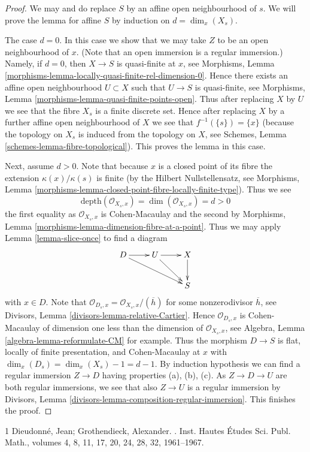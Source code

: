 \documentclass[10pt,a4paper]{amsart}
\theoremstyle{plain}
\theoremstyle{definition}
\theoremstyle{remark}
\numberwithin{equation}{subsection}
\begin{document}
\begin{proof}
We may and do replace $S$ by an affine open neighbourhood of $s$.
We will prove the lemma for affine $S$ by induction on $d = \dim_x(X_s)$.

\medskip\noindent
The case $d = 0$. In this case we show that we may take $Z$ to be
an open neighbourhood of $x$. (Note that an open immersion is
a regular immersion.) Namely, if $d = 0$, then $X \to S$
is quasi-finite at $x$, see
Morphisms, Lemma \ref{morphisms-lemma-locally-quasi-finite-rel-dimension-0}.
Hence there exists an affine open neighbourhood $U \subset X$ such
that $U \to S$ is quasi-finite, see
Morphisms, Lemma \ref{morphisms-lemma-quasi-finite-points-open}.
Thus after replacing $X$ by $U$ we see that the fibre $X_s$ is a finite
discrete set. Hence after replacing $X$ by a further affine open neighbourhood
of $X$ we see that $f^{-1}(\{s\}) = \{x\}$ (because the topology
on $X_s$ is induced from the topology on $X$, see
Schemes, Lemma \ref{schemes-lemma-fibre-topological}).
This proves the lemma in this case.

\medskip\noindent
Next, assume $d > 0$. Note that because $x$ is a closed point of its
fibre the extension $\kappa(x)/\kappa(s)$ is finite (by the
Hilbert Nullstellensatz, see
Morphisms, Lemma \ref{morphisms-lemma-closed-point-fibre-locally-finite-type}).
Thus we see
$$
\text{depth}(\mathcal{O}_{X_s, x}) = \dim(\mathcal{O}_{X_s, x}) = d > 0
$$
the first equality as $\mathcal{O}_{X_s, x}$ is Cohen-Macaulay and
the second by
Morphisms, Lemma \ref{morphisms-lemma-dimension-fibre-at-a-point}.
Thus we may apply
Lemma \ref{lemma-slice-once}
to find a diagram
$$
\xymatrix{
D \ar[r] \ar[rrd] & U \ar[r] \ar[rd] & X \ar[d] \\
& & S
}
$$
with $x \in D$. Note that
$\mathcal{O}_{D_s, x} = \mathcal{O}_{X_s, x}/(\overline{h})$ for some
nonzerodivisor $\overline{h}$, see
Divisors, Lemma \ref{divisors-lemma-relative-Cartier}.
Hence $\mathcal{O}_{D_s, x}$ is Cohen-Macaulay of dimension
one less than the dimension of $\mathcal{O}_{X_s, x}$, see
Algebra, Lemma \ref{algebra-lemma-reformulate-CM}
for example. Thus the morphism $D \to S$ is flat,
locally of finite presentation, and Cohen-Macaulay at $x$ with
$\dim_x(D_s) = \dim_x(X_s) - 1 = d - 1$. By induction hypothesis
we can find a regular immersion $Z \to D$ having properties (a), (b), (c).
As $Z \to D \to U$ are both regular immersions, we see that also
$Z \to U$ is a regular immersion by
Divisors, Lemma \ref{divisors-lemma-composition-regular-immersion}.
This finishes the proof.
\end{proof}

\begin{thebibliography}{1}
Dieudonn\'{e}, Jean; Grothendieck, Alexander.
.
\newblock Inst. Hautes \'{E}tudes Sci. Publ. Math., volumes 4, 8, 11, 17, 20, 24, 28, 32, 1961--1967.
\end{thebibliography}
\end{document}
